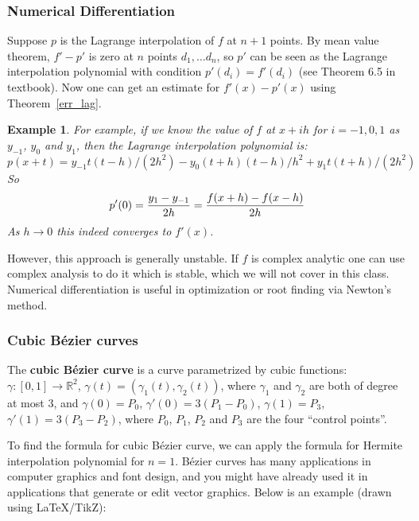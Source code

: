 \documentclass[20pt]{article} %
\theoremstyle{break}
\newtheorem{exa}[definition]{Example}
\begin{document}
\subsubsection{Numerical Differentiation}\label{nd}
Suppose $p$ is the Lagrange interpolation of $f$ at $n+1$ points. By mean value theorem, $f'-p'$ is zero at $n$ points $d_1, \dots d_n$, so $p'$ can be seen as the Lagrange interpolation polynomial with condition $p'(d_i)=f'(d_i)$ (see Theorem 6.5 in textbook). Now one can get an estimate for $f'(x)-p'(x)$ using Theorem~\ref{err_lag}.\\

\begin{exa}
  For example, if we know the value of $f$ at $x+ih$ for $i=-1, 0, 1$ as $y_{-1}$, $y_0$ and $y_1$, then the Lagrange interpolation polynomial is:
  \[p(x+t)=y_{-1}t(t-h)/(2h^2)-y_0(t+h)(t-h)/h^2+y_1t(t+h)/(2h^2)\]
  So
  \[p'(0)={y_1-y_{-1}\over 2h}={f(x+h)-f(x-h)\over 2h}\]
  As $h\rightarrow 0$ this indeed converges to $f'(x)$.
 \end{exa}

However, this approach is generally unstable. If $f$ is complex analytic one can use complex analysis to do it which is stable, which we will not cover in this class.\\

Numerical differentiation is useful in optimization or root finding via Newton's method.

\newpage

\subsubsection{Cubic B{\'e}zier curves}
The {\bf cubic B{\'e}zier curve} is a curve parametrized by cubic functions: $\gamma: [0, 1]\rightarrow \mathbb{R}^2$, $\gamma(t)=(\gamma_1(t), \gamma_2(t))$, where $\gamma_1$ and $\gamma_2$ are both of degree at most $3$, and $\gamma(0)=P_0$, $\gamma'(0)=3(P_1-P_0)$, $\gamma(1)=P_3$, $\gamma'(1)=3(P_3-P_2)$, where $P_0$, $P_1$, $P_2$ and $P_3$ are the four ``control points''.

To find the formula for cubic B{\'e}zier curve, we can apply the formula for Hermite interpolation polynomial for $n=1$. B{\'e}zier curves has many applications in computer graphics and font design, and you might have already used it in applications that generate or edit vector graphics. Below is an example (drawn using LaTeX/TikZ):
\begin{figure}[H]
\end{figure}
\newpage
\end{document}
